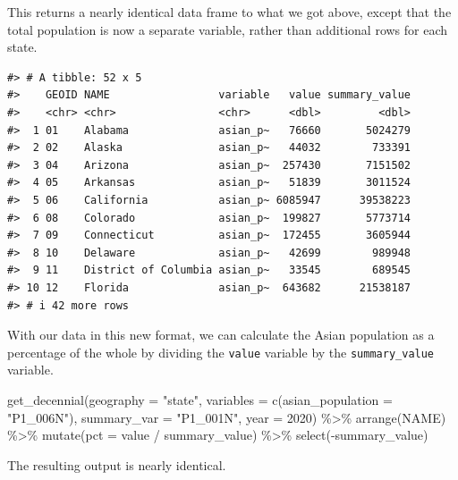 \documentclass[
]{book}
\newenvironment{Shaded}{\begin{snugshade}}{\end{snugshade}}
\newcommand{\AttributeTok}[1]{\textcolor[rgb]{0.77,0.63,0.00}{#1}}
\newcommand{\DecValTok}[1]{\textcolor[rgb]{0.00,0.00,0.81}{#1}}
\newcommand{\FunctionTok}[1]{\textcolor[rgb]{0.00,0.00,0.00}{#1}}
\newcommand{\NormalTok}[1]{#1}
\newcommand{\SpecialCharTok}[1]{\textcolor[rgb]{0.00,0.00,0.00}{#1}}
\newcommand{\StringTok}[1]{\textcolor[rgb]{0.31,0.60,0.02}{#1}}
\begin{document}
This returns a nearly identical data frame to what we got above, except that the total population is now a separate variable, rather than additional rows for each state.

\begin{verbatim}
#> # A tibble: 52 x 5
#>    GEOID NAME                 variable   value summary_value
#>    <chr> <chr>                <chr>      <dbl>         <dbl>
#>  1 01    Alabama              asian_p~   76660       5024279
#>  2 02    Alaska               asian_p~   44032        733391
#>  3 04    Arizona              asian_p~  257430       7151502
#>  4 05    Arkansas             asian_p~   51839       3011524
#>  5 06    California           asian_p~ 6085947      39538223
#>  6 08    Colorado             asian_p~  199827       5773714
#>  7 09    Connecticut          asian_p~  172455       3605944
#>  8 10    Delaware             asian_p~   42699        989948
#>  9 11    District of Columbia asian_p~   33545        689545
#> 10 12    Florida              asian_p~  643682      21538187
#> # i 42 more rows
\end{verbatim}

With our data in this new format, we can calculate the Asian population as a percentage of the whole by dividing the \texttt{value} variable by the \texttt{summary\_value} variable.

\begin{Shaded}
\begin{Highlighting}[]
\FunctionTok{get\_decennial}\NormalTok{(}\AttributeTok{geography =} \StringTok{"state"}\NormalTok{, }
              \AttributeTok{variables =} \FunctionTok{c}\NormalTok{(}\AttributeTok{asian\_population =} \StringTok{"P1\_006N"}\NormalTok{),}
              \AttributeTok{summary\_var =} \StringTok{"P1\_001N"}\NormalTok{,}
              \AttributeTok{year =} \DecValTok{2020}\NormalTok{) }\SpecialCharTok{\%\textgreater{}\%} 
  \FunctionTok{arrange}\NormalTok{(NAME) }\SpecialCharTok{\%\textgreater{}\%} 
  \FunctionTok{mutate}\NormalTok{(}\AttributeTok{pct =}\NormalTok{ value }\SpecialCharTok{/}\NormalTok{ summary\_value) }\SpecialCharTok{\%\textgreater{}\%} 
  \FunctionTok{select}\NormalTok{(}\SpecialCharTok{{-}}\NormalTok{summary\_value)}
\end{Highlighting}
\end{Shaded}

The resulting output is nearly identical.
\end{document}
